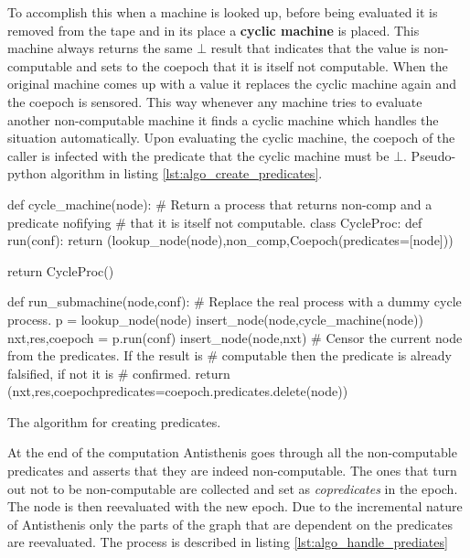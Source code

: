 To accomplish this when a machine is looked up, before being evaluated
it is removed from the tape and in its place a \textbf{cyclic machine}
is placed. This machine always returns the same \(\bot\) result that
indicates that the value is non-computable and sets to the coepoch
that it is itself not computable. When the original machine comes up
with a value it replaces the cyclic machine again and the coepoch is
sensored. This way whenever any machine tries to evaluate another
non-computable machine it finds a cyclic machine which handles the
situation automatically. Upon evaluating the cyclic machine, the
coepoch of the caller is infected with the predicate that the cyclic
machine must be \(\bot\). Pseudo-python algorithm in listing
\ref{lst:algo_create_predicates}.

\begin{code}
\begin{pycode}
def cycle_machine(node):
    # Return a process that returns non-comp and a predicate nofifying
    # that it is itself not computable.
    class CycleProc:
        def run(conf):
           return (lookup_node(node),non_comp,Coepoch(predicates=[node]))

    return CycleProc()

def run_submachine(node,conf):
    # Replace the real process with a dummy cycle process.
    p = lookup_node(node)
    insert_node(node,cycle_machine(node))
    nxt,res,coepoch = p.run(conf)
    insert_node(node,nxt)
    # Censor the current node from the predicates. If the result is
    # computable then the predicate is already falsified, if not it is
    # confirmed.
    return (nxt,res,coepoch{predicates=coepoch.predicates.delete(node)})
\end{pycode}
  \caption{\label{lst:algo_create_predicates}The algorithm for
    creating predicates.}
\end{code}

At the end of the computation Antisthenis goes through all the
non-computable predicates and asserts that they are indeed
non-computable. The ones that turn out not to be non-computable are
collected and set as \emph{copredicates} in the epoch. The node is
then reevaluated with the new epoch. Due to the incremental nature of
Antisthenis only the parts of the graph that are dependent on the
predicates are reevaluated. The process is described in listing
\ref{lst:algo_handle_prediates}

